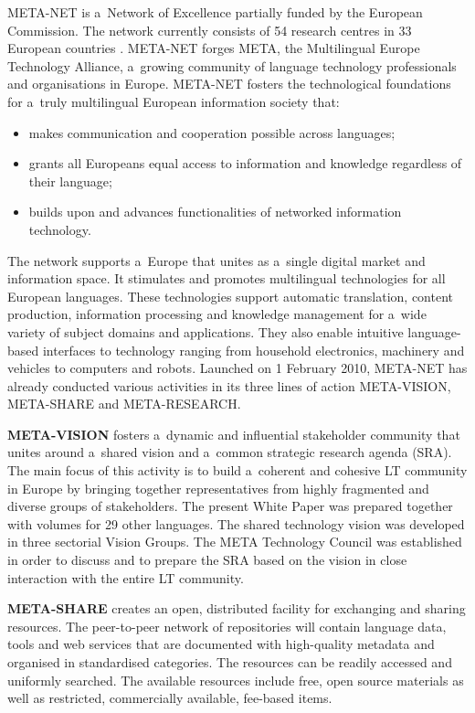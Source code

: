 \begin{multicols}{2} 

META-NET is a~Network of Excellence partially funded by the European
Commission. The network currently consists of 54 research centres in
33 European countries \cite{rehm2011}. META-NET forges META, the
Multilingual Europe Technology Alliance, a~growing community of
language technology professionals and organisations in Europe.
META-NET fosters the technological foundations for a~truly
multilingual European information society that: 

\begin{itemize} \item makes communication and cooperation possible
across languages; \item grants all Europeans equal access to
information and knowledge regardless of their language; \item builds
upon and advances functionalities of networked information technology.
\end{itemize} 

The network supports a~Europe that unites as a~single digital market
and information space. It stimulates and promotes multilingual
technologies for all European languages. These technologies support
automatic translation, content production, information processing and
knowledge management for a~wide variety of subject domains and
applications. They also enable intuitive language-based interfaces to
technology ranging from household electronics, machinery and vehicles
to computers and robots. Launched on 1 February 2010, META-NET has
already conducted various activities in its three lines of action
META-VISION, META-SHARE and META-RESEARCH. 

\textbf{META-VISION} fosters a~dynamic and influential stakeholder
community that unites around a~shared vision and a~common strategic
research agenda (SRA). The main focus of this activity is to build
a~coherent and cohesive LT community in Europe by bringing together
representatives from highly fragmented and diverse groups of
stakeholders. The present White Paper was prepared together with
volumes for 29 other languages. The shared technology vision was
developed in three sectorial Vision Groups. The META Technology
Council was established in order to discuss and to prepare the SRA
based on the vision in close interaction with the entire LT community. 

\textbf{META-SHARE} creates an open, distributed facility for
exchanging and sharing resources. The peer-to-peer network of
repositories will contain language data, tools and web services that
are documented with high-quality metadata and organised in
standardised categories. The resources can be readily accessed and
uniformly searched. The available resources include free, open source
materials as well as restricted, commercially available, fee-based
items. 


\end{multicols}
